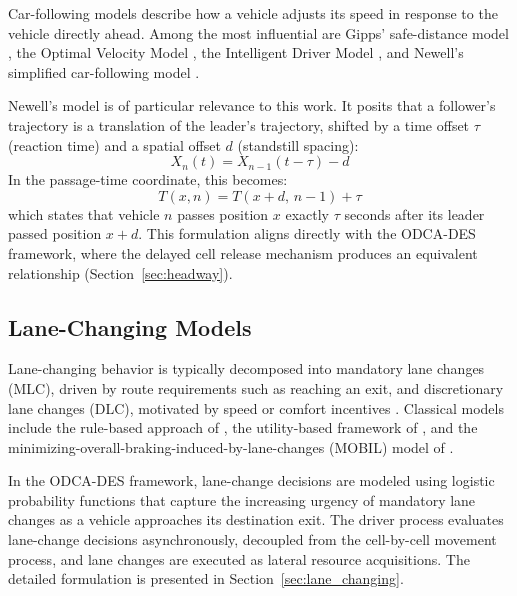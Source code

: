 \documentclass[review,authoryear]{elsarticle}
\begin{document}
Car-following models describe how a vehicle adjusts its speed in response to the vehicle directly ahead. Among the most influential are Gipps' safe-distance model \citep{gipps1981behavioural}, the Optimal Velocity Model \citep{bando1995dynamical}, the Intelligent Driver Model \citep{treiber2000congested}, and Newell's simplified car-following model \citep{newell2002simplified}.

Newell's model is of particular relevance to this work. It posits that a follower's trajectory is a translation of the leader's trajectory, shifted by a time offset $\tau$ (reaction time) and a spatial offset $d$ (standstill spacing):
\begin{equation}
    X_{n}(t) = X_{n-1}(t - \tau) - d
    \label{eq:newell_cf}
\end{equation}
In the passage-time coordinate, this becomes:
\begin{equation}
    T(x, n) = T(x + d,\, n-1) + \tau
    \label{eq:newell_cf_Txn}
\end{equation}
which states that vehicle $n$ passes position $x$ exactly $\tau$ seconds after its leader passed position $x + d$. This formulation aligns directly with the ODCA-DES framework, where the delayed cell release mechanism produces an equivalent relationship (Section~\ref{sec:headway}).

\subsection{Lane-Changing Models}
\label{sec:lit_lc}

Lane-changing behavior is typically decomposed into mandatory lane changes (MLC), driven by route requirements such as reaching an exit, and discretionary lane changes (DLC), motivated by speed or comfort incentives \citep{zheng2014recent}. Classical models include the rule-based approach of \citet{gipps1986model}, the utility-based framework of \citet{toledo2003modeling}, and the minimizing-overall-braking-induced-by-lane-changes (MOBIL) model of \citet{kesting2007general}.

In the ODCA-DES framework, lane-change decisions are modeled using logistic probability functions that capture the increasing urgency of mandatory lane changes as a vehicle approaches its destination exit. The driver process evaluates lane-change decisions asynchronously, decoupled from the cell-by-cell movement process, and lane changes are executed as lateral resource acquisitions. The detailed formulation is presented in Section~\ref{sec:lane_changing}.
\end{document}
